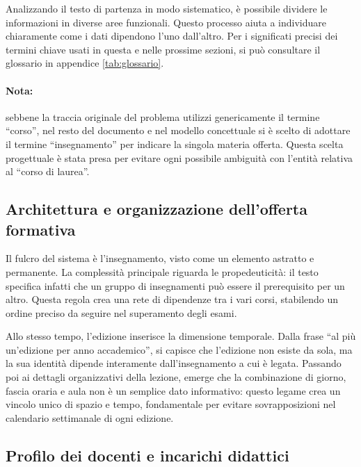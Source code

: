 Analizzando il testo di partenza in modo sistematico, è possibile dividere le informazioni in diverse aree funzionali. Questo processo aiuta a individuare chiaramente come i dati dipendono l'uno dall'altro. Per i significati precisi dei termini chiave usati in questa e nelle prossime sezioni, si può consultare il glossario in appendice \ref{tab:glossario}.

\paragraph{Nota:} sebbene la traccia originale del problema utilizzi genericamente il termine \enquote{corso}, nel resto del documento e nel modello concettuale si è scelto di adottare il termine \enquote{insegnamento} per indicare la singola materia offerta. Questa scelta progettuale è stata presa per evitare ogni possibile ambiguità con l'entità relativa al \enquote{corso di laurea}.

\subsection{Architettura e organizzazione dell'offerta formativa}
\label{ssec:architettura-e-organizzazione-dell-offerta-formativa}

Il fulcro del sistema è l'insegnamento, visto come un elemento astratto e permanente.
La complessità principale riguarda le propedeuticità: il testo specifica infatti che un gruppo di insegnamenti può essere il prerequisito per un altro.
Questa regola crea una rete di dipendenze tra i vari corsi, stabilendo un ordine preciso da seguire nel superamento degli esami.

Allo stesso tempo, l'edizione inserisce la dimensione temporale.
Dalla frase \enquote{al più un'edizione per anno accademico}, si capisce che l'edizione non esiste da sola, ma la sua identità dipende interamente dall'insegnamento a cui è legata.
Passando poi ai dettagli organizzativi della lezione, emerge che la combinazione di giorno, fascia oraria e aula non è un semplice dato informativo: questo legame crea un vincolo unico di spazio e tempo, fondamentale per evitare sovrapposizioni nel calendario settimanale di ogni edizione.

\subsection{Profilo dei docenti e incarichi didattici}
\label{ssec:profilo-dei-docenti-e-incarichi-didattici}

